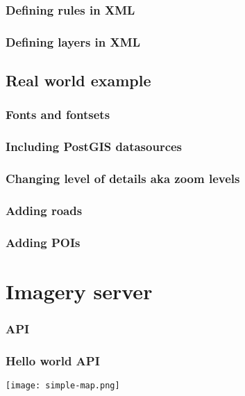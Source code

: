 \documentclass{beamer}
\begin{document}
\begin{frame}
  \frametitle{Defining rules in XML}

\end{frame}

\begin{frame}
  \frametitle{Defining layers in XML}

\end{frame}

\subsection{Real world example}

\begin{frame}
  \frametitle{Fonts and fontsets}

\end{frame}

\begin{frame}
  \frametitle{Including PostGIS datasources}

\end{frame}

\begin{frame}
  \frametitle{Changing level of details aka zoom levels}

\end{frame}

\begin{frame}
  \frametitle{Adding roads}

\end{frame}


\begin{frame}
  \frametitle{Adding POIs}

\end{frame}


\section{Imagery server}

\begin{frame}
  \frametitle{API}

\end{frame}

\begin{frame}[fragile]
  \frametitle{Hello world API}
  \begin{centering}
    \texttt{[image: simple-map.png]}
  \end{centering}
\end{frame}
\end{document}
